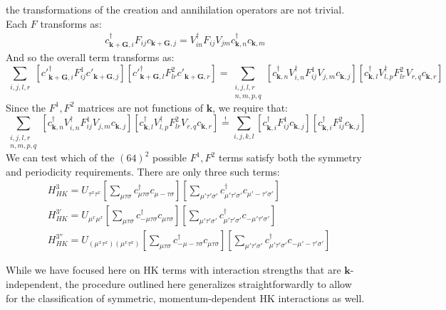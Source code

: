 \documentclass[prb,aps,amssymb,twocolumn,notitlepage]{revtex4-2}
\begin{document}
the transformations of the creation and annihilation operators are not trivial. 
Each $F$ transforms as:
\begin{align}
c^\dagger_{\mathbf{k}+\mathbf{G},i}F_{ij}c_{\mathbf{k}+\mathbf{G},j}=V^\dagger_{in}F_{ij}V_{jm}c^\dagger_{\mathbf{k},n}c_{\mathbf{k},m}
\end{align}
And so the overall term transforms as:
\begin{equation}
\sum_{\substack{i,j,l,r}}\left[c'^\dagger_{\mathbf{k}+\mathbf{G},i}F^{1}_{ij}c'_{\mathbf{k}+\mathbf{G},j}\right]
\left[c'^\dagger_{\mathbf{k}+\mathbf{G},l}F^{2}_{lr}c'_{\mathbf{k}+\mathbf{G},r}\right]=
\sum_{\substack{i,j,l,r\\n,m,p,q}}\left[c^\dagger_{\mathbf{k},n}V^\dagger_{i,n}F^{1}_{ij}V_{j,m}c_{\mathbf{k},j}\right]
\left[c^\dagger_{\mathbf{k},l}V^\dagger_{l,p}F^{2}_{lr}V_{r,q}c_{\mathbf{k},r}\right]
\end{equation}
Since the $F^1,F^2$ matrices are not functions of $\mathbf{k}$, we require that:
\begin{equation}
\label{eq:Fcondition}
\sum_{\substack{i,j,l,r\\n,m,p,q}}\left[c^\dagger_{\mathbf{k},n}V^\dagger_{i,n}F^{1}_{ij}V_{j,m}c_{\mathbf{k},j}\right]
\left[c^\dagger_{\mathbf{k},l}V^\dagger_{l,p}F^{2}_{lr}V_{r,q}c_{\mathbf{k},r}\right]\overset{!}{=}
\sum_{i,j,k,l}\left[c^\dagger_{\mathbf{k},i}F^{1}_{ij}c_{\mathbf{k},j}\right]\left[c^\dagger_{\mathbf{k},i}F^{2}_{ij}c_{\mathbf{k},j}\right]
\end{equation}
We can test which of the $(64)^2$ possible $F^{1},F^{2}$ terms satisfy both the symmetry and periodicity requirements. 
There are only three such terms:
\begin{align}
&H^{3}_{HK}=U_{\tau^x\tau^x}\left[\sum_{\mu\tau\sigma}c^\dagger_{\mu\tau\sigma}c_{\mu-\tau\sigma}\right]
\left[\sum_{\mu'\tau'\sigma'}c^\dagger_{\mu'\tau'\sigma'}c_{\mu'-\tau'\sigma'}\right] \label{eq:135f1}\\
&H^{3'}_{HK}=U_{\mu^x\mu^x}\left[\sum_{\mu\tau\sigma}c^\dagger_{-\mu\tau\sigma}c_{\mu\tau\sigma}\right]
\left[\sum_{\mu'\tau'\sigma'}c^\dagger_{\mu'\tau'\sigma'}c_{-\mu'{\tau'}\sigma'}\right]\label{eq:135f2}\\
&H^{3''}_{HK}=U_{(\mu^x\tau^x)(\mu^x\tau^x)}\left[\sum_{\mu\tau\sigma}c^\dagger_{-\mu-\tau\sigma}c_{\mu\tau\sigma}\right]
\left[\sum_{\mu'\tau'\sigma'}c^\dagger_{\mu'\tau'\sigma'}c_{-\mu'-\tau'\sigma'}\right]\label{eq:135f3}
\end{align}

While we have focused here on HK terms with interaction strengths that are $\mathbf{k}$-independent, the procedure outlined here generalizes straightforwardly to allow for the classification of symmetric, momentum-dependent HK interactions as well.
\end{document}
